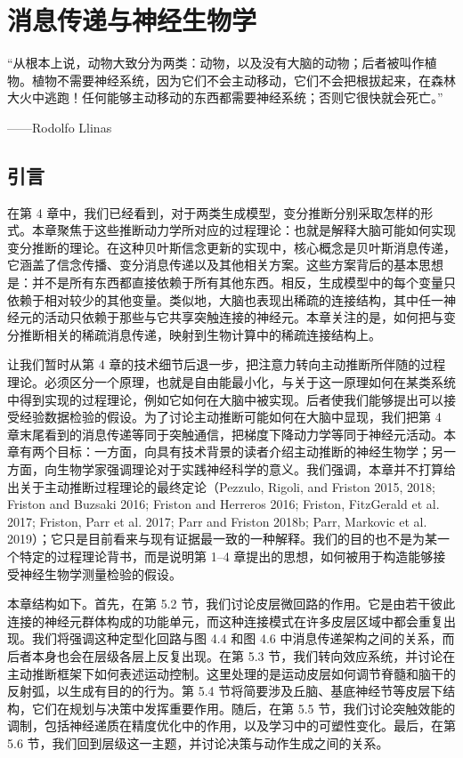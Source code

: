 \chapter{消息传递与神经生物学}

“从根本上说，动物大致分为两类：动物，以及没有大脑的动物；后者被叫作植物。植物不需要神经系统，因为它们不会主动移动，它们不会把根拔起来，在森林大火中逃跑！任何能够主动移动的东西都需要神经系统；否则它很快就会死亡。”

——Rodolfo Llinas

\section{引言}

在第 4 章中，我们已经看到，对于两类生成模型，变分推断分别采取怎样的形式。本章聚焦于这些推断动力学所对应的过程理论：也就是解释大脑可能如何实现变分推断的理论。在这种贝叶斯信念更新的实现中，核心概念是贝叶斯消息传递，它涵盖了信念传播、变分消息传递以及其他相关方案。这些方案背后的基本思想是：并不是所有东西都直接依赖于所有其他东西。相反，生成模型中的每个变量只依赖于相对较少的其他变量。类似地，大脑也表现出稀疏的连接结构，其中任一神经元的活动只依赖于那些与它共享突触连接的神经元。本章关注的是，如何把与变分推断相关的稀疏消息传递，映射到生物计算中的稀疏连接结构上。

让我们暂时从第 4 章的技术细节后退一步，把注意力转向主动推断所伴随的过程理论。必须区分一个原理，也就是自由能最小化，与关于这一原理如何在某类系统中得到实现的过程理论，例如它如何在大脑中被实现。后者使我们能够提出可以接受经验数据检验的假设。为了讨论主动推断可能如何在大脑中显现，我们把第 4 章末尾看到的消息传递等同于突触通信，把梯度下降动力学等同于神经元活动。本章有两个目标：一方面，向具有技术背景的读者介绍主动推断的神经生物学；另一方面，向生物学家强调理论对于实践神经科学的意义。我们强调，本章并不打算给出关于主动推断过程理论的最终定论（Pezzulo, Rigoli, and Friston 2015, 2018; Friston and Buzsaki 2016; Friston and Herreros 2016; Friston, FitzGerald et al. 2017; Friston, Parr et al. 2017; Parr and Friston 2018b; Parr, Markovic et al. 2019）；它只是目前看来与现有证据最一致的一种解释。我们的目的也不是为某一个特定的过程理论背书，而是说明第 1--4 章提出的思想，如何被用于构造能够接受神经生物学测量检验的假设。

本章结构如下。首先，在第 5.2 节，我们讨论皮层微回路的作用。它是由若干彼此连接的神经元群体构成的功能单元，而这种连接模式在许多皮层区域中都会重复出现。我们将强调这种定型化回路与图 4.4 和图 4.6 中消息传递架构之间的关系，而后者本身也会在层级各层上反复出现。在第 5.3 节，我们转向效应系统，并讨论在主动推断框架下如何表述运动控制。这里处理的是运动皮层如何调节脊髓和脑干的反射弧，以生成有目的的行为。第 5.4 节将简要涉及丘脑、基底神经节等皮层下结构，它们在规划与决策中发挥重要作用。随后，在第 5.5 节，我们讨论突触效能的调制，包括神经递质在精度优化中的作用，以及学习中的可塑性变化。最后，在第 5.6 节，我们回到层级这一主题，并讨论决策与动作生成之间的关系。

